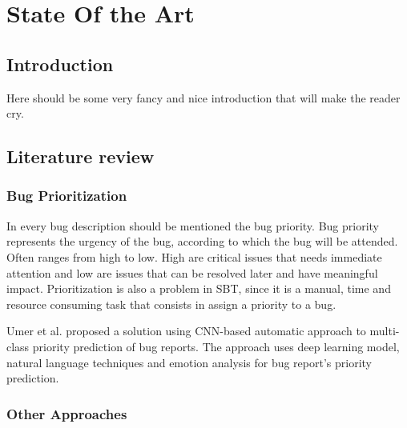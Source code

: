 
%

\chapter{State Of the Art}
\label{cha:users_manual}


\section{Introduction}
\label{sec:introduction}

	Here should be some very fancy and nice introduction that will make the reader cry.

\section{Literature review}
\label{sec:literature_review}

\subsection{Bug Prioritization}


In every bug description should be mentioned the bug priority. Bug priority represents the urgency of the bug, according to which the bug will be attended. Often ranges from high to low. High are critical issues that needs immediate attention and low are issues that can be resolved later and have meaningful impact. Prioritization is also a problem in SBT, since it is a manual, time and resource consuming task that consists in assign a priority to a bug. 

Umer et al. \cite{Umer2020} proposed a solution using CNN-based automatic approach to multi-class priority prediction of bug reports. The approach uses deep learning model, natural language techniques and emotion analysis for bug report's priority prediction.

\subsection{Other Approaches}


